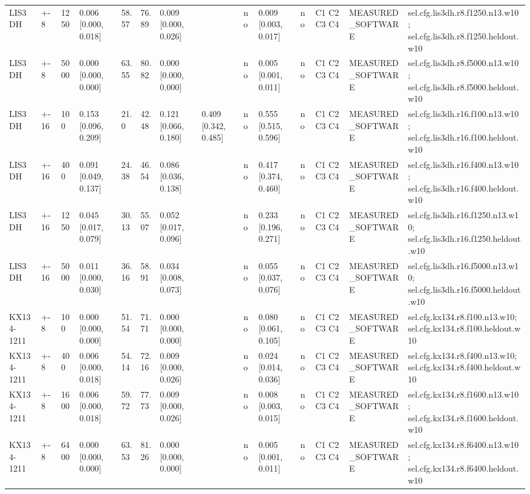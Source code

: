 \begin{table}[t]
\begin{tabular}{llllllllllllll}
LIS3DH & +-8 & 1250 & 0.006 [0.000, 0.018] & 58.57 & 76.89 & 0.009 [0.000, 0.026] &  & no & 0.009 [0.003, 0.017] & no & C1 C2 C3 C4 & MEASURED\_SOFTWARE & sel.cfg.lis3dh.r8.f1250.n13.w10; sel.cfg.lis3dh.r8.f1250.heldout.w10 \\
LIS3DH & +-8 & 5000 & 0.000 [0.000, 0.000] & 63.55 & 80.82 & 0.000 [0.000, 0.000] &  & no & 0.005 [0.001, 0.011] & no & C1 C2 C3 C4 & MEASURED\_SOFTWARE & sel.cfg.lis3dh.r8.f5000.n13.w10; sel.cfg.lis3dh.r8.f5000.heldout.w10 \\
LIS3DH & +-16 & 100 & 0.153 [0.096, 0.209] & 21.0 & 42.48 & 0.121 [0.066, 0.180] & 0.409 [0.342, 0.485] & no & 0.555 [0.515, 0.596] & no & C1 C2 C3 C4 & MEASURED\_SOFTWARE & sel.cfg.lis3dh.r16.f100.n13.w10; sel.cfg.lis3dh.r16.f100.heldout.w10 \\
LIS3DH & +-16 & 400 & 0.091 [0.049, 0.137] & 24.38 & 46.54 & 0.086 [0.036, 0.138] &  & no & 0.417 [0.374, 0.460] & no & C1 C2 C3 C4 & MEASURED\_SOFTWARE & sel.cfg.lis3dh.r16.f400.n13.w10; sel.cfg.lis3dh.r16.f400.heldout.w10 \\
LIS3DH & +-16 & 1250 & 0.045 [0.017, 0.079] & 30.13 & 55.07 & 0.052 [0.017, 0.096] &  & no & 0.233 [0.196, 0.271] & no & C1 C2 C3 C4 & MEASURED\_SOFTWARE & sel.cfg.lis3dh.r16.f1250.n13.w10; sel.cfg.lis3dh.r16.f1250.heldout.w10 \\
LIS3DH & +-16 & 5000 & 0.011 [0.000, 0.030] & 36.16 & 58.91 & 0.034 [0.008, 0.073] &  & no & 0.055 [0.037, 0.076] & no & C1 C2 C3 C4 & MEASURED\_SOFTWARE & sel.cfg.lis3dh.r16.f5000.n13.w10; sel.cfg.lis3dh.r16.f5000.heldout.w10 \\
KX134-1211 & +-8 & 100 & 0.000 [0.000, 0.000] & 51.54 & 71.71 & 0.000 [0.000, 0.000] &  & no & 0.080 [0.061, 0.105] & no & C1 C2 C3 C4 & MEASURED\_SOFTWARE & sel.cfg.kx134.r8.f100.n13.w10; sel.cfg.kx134.r8.f100.heldout.w10 \\
KX134-1211 & +-8 & 400 & 0.006 [0.000, 0.018] & 54.14 & 72.16 & 0.009 [0.000, 0.026] &  & no & 0.024 [0.014, 0.036] & no & C1 C2 C3 C4 & MEASURED\_SOFTWARE & sel.cfg.kx134.r8.f400.n13.w10; sel.cfg.kx134.r8.f400.heldout.w10 \\
KX134-1211 & +-8 & 1600 & 0.006 [0.000, 0.018] & 59.72 & 77.73 & 0.009 [0.000, 0.026] &  & no & 0.008 [0.003, 0.015] & no & C1 C2 C3 C4 & MEASURED\_SOFTWARE & sel.cfg.kx134.r8.f1600.n13.w10; sel.cfg.kx134.r8.f1600.heldout.w10 \\
KX134-1211 & +-8 & 6400 & 0.000 [0.000, 0.000] & 63.53 & 81.26 & 0.000 [0.000, 0.000] &  & no & 0.005 [0.001, 0.011] & no & C1 C2 C3 C4 & MEASURED\_SOFTWARE & sel.cfg.kx134.r8.f6400.n13.w10; sel.cfg.kx134.r8.f6400.heldout.w10 \\

\end{tabular}
\end{table}
